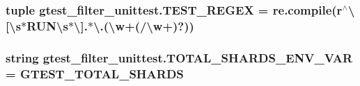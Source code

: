 \subsubsection[{T\+E\+S\+T\+\_\+\+R\+E\+G\+E\+X}]{\setlength{\rightskip}{0pt plus 5cm}tuple gtest\+\_\+filter\+\_\+unittest.\+T\+E\+S\+T\+\_\+\+R\+E\+G\+E\+X = re.\+compile(r\textquotesingle{}$^\wedge$\textbackslash{}\mbox{[}\textbackslash{}s$\ast$R\+U\+N\textbackslash{}s$\ast$\textbackslash{}\mbox{]}.$\ast$\textbackslash{}.(\textbackslash{}w+(/\textbackslash{}w+)?)\textquotesingle{})}\label{namespacegtest__filter__unittest_a4f2249fe4f1b7360c2fe2304a81f9e51}
\hypertarget{namespacegtest__filter__unittest_a3b9a50b994f774c1cebbc52971708e4e}{}
\subsubsection[{T\+O\+T\+A\+L\+\_\+\+S\+H\+A\+R\+D\+S\+\_\+\+E\+N\+V\+\_\+\+V\+A\+R}]{\setlength{\rightskip}{0pt plus 5cm}string gtest\+\_\+filter\+\_\+unittest.\+T\+O\+T\+A\+L\+\_\+\+S\+H\+A\+R\+D\+S\+\_\+\+E\+N\+V\+\_\+\+V\+A\+R = \textquotesingle{}G\+T\+E\+S\+T\+\_\+\+T\+O\+T\+A\+L\+\_\+\+S\+H\+A\+R\+D\+S\textquotesingle{}}\label{namespacegtest__filter__unittest_a3b9a50b994f774c1cebbc52971708e4e}

